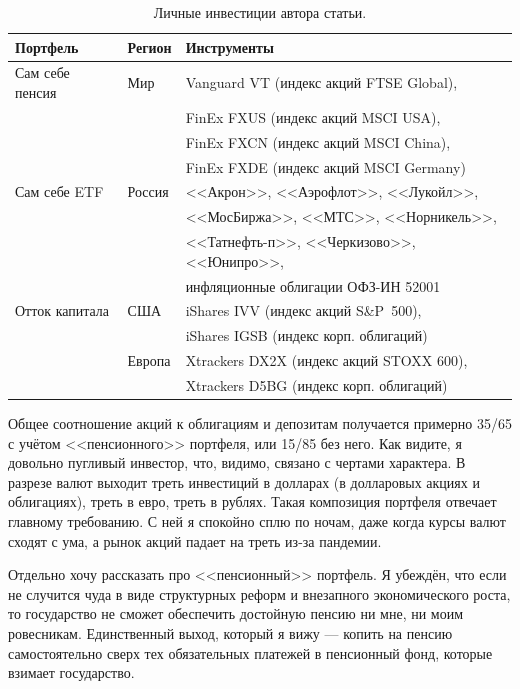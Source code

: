 \begin{table}[h]
\centering
\begin{tabular}{l|l|l}
Портфель        & Регион & Инструменты \\
\hline
Сам себе пенсия & Мир    & Vanguard VT (индекс акций FTSE Global), \\
                &        & FinEx FXUS (индекс акций MSCI USA), \\ 
                &        & FinEx FXCN (индекс акций MSCI China), \\
                &        & FinEx FXDE (индекс акций MSCI Germany) \\
\hline
Сам себе ETF    & Россия & <<Акрон>>, <<Аэрофлот>>, <<Лукойл>>, \\
                &        & <<МосБиржа>>, <<МТС>>, <<Норникель>>,\\
                &        & <<Татнефть-п>>, <<Черкизово>>, <<Юнипро>>, \\
                &        & инфляционные облигации ОФЗ-ИН 52001 \\
\hline
Отток капитала  & США    & iShares IVV (индекс акций S\&P~500), \\
                &        & iShares IGSB (индекс корп. облигаций) \\
\cline{2-3}
                & Европа & Xtrackers DX2X (индекс акций STOXX 600), \\
                &        & Xtrackers D5BG (индекс корп. облигаций)
\end{tabular}
\caption{Личные инвестиции автора статьи.}
\label{personal_portfolios}
\end{table}

Общее соотношение акций к облигациям и депозитам получается примерно 35/65 с 
учётом <<пенсионного>> портфеля, или 15/85 без него. Как видите, я довольно 
пугливый инвестор, что, видимо, связано с чертами характера. В разрезе валют 
выходит треть инвестиций в долларах (в долларовых акциях и облигациях), треть в 
евро, треть в рублях. Такая композиция портфеля отвечает главному требованию. С 
ней я спокойно сплю по ночам, даже когда курсы валют сходят с ума, а рынок 
акций падает на треть из-за пандемии.

Отдельно хочу рассказать про <<пенсионный>> портфель. Я убеждён, что если не 
случится чуда в виде структурных реформ и внезапного экономического роста, то 
государство не сможет обеспечить достойную пенсию ни мне, ни моим ровесникам. 
Единственный выход, который я вижу --- копить на пенсию самостоятельно сверх 
тех обязательных платежей в пенсионный фонд, которые взимает государство.

